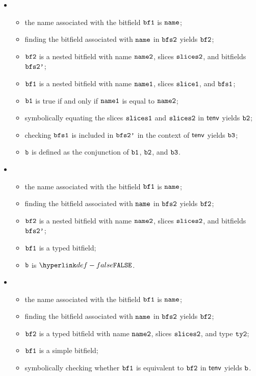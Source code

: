 \begin{itemize}
  \item {}
  \begin{itemize}
    \item the name associated with the bitfield $\texttt{bf1}$ is $\texttt{name}$;
    \item finding the bitfield associated with $\texttt{name}$ in $\texttt{bfs2}$ yields $\texttt{bf2}$;
    \item $\texttt{bf2}$ is a nested bitfield with name $\texttt{name2}$, slices $\texttt{slices2}$, and bitfields $\texttt{bfs2'}$;
    \item $\texttt{bf1}$ is a nested bitfield with name $\texttt{name1}$, slices $\texttt{slice1}$, and $\texttt{bfs1}$;
    \item $\texttt{b1}$ is true if and only if $\texttt{name1}$ is equal to $\texttt{name2}$;
    \item symbolically equating the slices $\texttt{slices1}$ and $\texttt{slices2}$ in $\textsf{tenv}$ yields $\texttt{b2}$;
    \item checking $\texttt{bfs1}$ is included in $\texttt{bfs2'}$ in the context of $\textsf{tenv}$ yields $\texttt{b3}$;
    \item $\texttt{b}$ is defined as the conjunction of $\texttt{b1}$, $\texttt{b2}$, and $\texttt{b3}$.
  \end{itemize}

  \item {}
  \begin{itemize}
    \item the name associated with the bitfield $\texttt{bf1}$ is $\texttt{name}$;
    \item finding the bitfield associated with $\texttt{name}$ in $\texttt{bfs2}$ yields $\texttt{bf2}$;
    \item $\texttt{bf2}$ is a nested bitfield with name $\texttt{name2}$, slices $\texttt{slices2}$, and bitfields $\texttt{bfs2'}$;
    \item $\texttt{bf1}$ is a typed bitfield;
    \item $\texttt{b}$ is $\False$.
  \end{itemize}

  \item {}
  \begin{itemize}
    \item the name associated with the bitfield $\texttt{bf1}$ is $\texttt{name}$;
    \item finding the bitfield associated with $\texttt{name}$ in $\texttt{bfs2}$ yields $\texttt{bf2}$;
    \item $\texttt{bf2}$ is a typed bitfield with name $\texttt{name2}$, slices $\texttt{slices2}$, and type $\texttt{ty2}$;
    \item $\texttt{bf1}$ is a simple bitfield;
    \item symbolically checking whether $\texttt{bf1}$ is equivalent to $\texttt{bf2}$ in $\textsf{tenv}$ yields $\texttt{b}$.
  \end{itemize}


\end{itemize}
